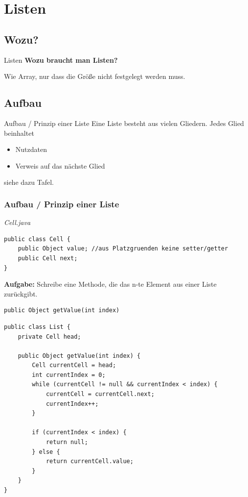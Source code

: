 \documentclass[18pt]{beamer}
\begin{document}
\section{Listen}
\subsection{Wozu?}
\begin{frame}{Listen}
	\textbf{Wozu braucht man Listen?}\pause
	
	Wie Array, nur dass die Größe nicht festgelegt werden muss.
\end{frame}

\subsection{Aufbau}
\begin{frame}{Aufbau / Prinzip einer Liste}
	Eine Liste besteht aus vielen Gliedern. Jedes Glied beinhaltet 
	\begin{itemize}
		\item Nutzdaten
		\item Verweis auf das nächste Glied
	\end{itemize}
	
	siehe dazu Tafel.
\end{frame}

\begin{frame}[containsverbatim]
	\frametitle{Aufbau / Prinzip einer Liste}
	
	\emph{Cell.java}
	\begin{lstlisting}
public class Cell {
	public Object value; //aus Platzgruenden keine setter/getter
	public Cell next;
}
	\end{lstlisting}
	
	\textbf{Aufgabe:} Schreibe eine Methode, die das n-te Element aus einer Liste zurückgibt.
	\begin{lstlisting}
public Object getValue(int index)
	\end{lstlisting}
\end{frame}

\begin{frame}[containsverbatim]
		
	\begin{lstlisting}
public class List {
	private Cell head;
	
	public Object getValue(int index) {
		Cell currentCell = head;
		int currentIndex = 0;
		while (currentCell != null && currentIndex < index) {
			currentCell = currentCell.next;
			currentIndex++;
		}

		if (currentIndex < index) {
			return null;
		} else {
			return currentCell.value;
		}
	}
}
	\end{lstlisting}
\end{frame}
\end{document}
